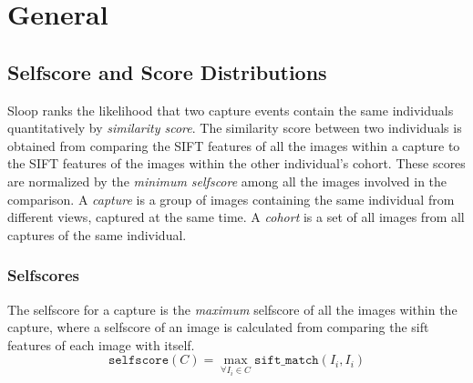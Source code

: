 \section{General}

\subsection{Selfscore and Score Distributions}

Sloop ranks the likelihood that two capture events contain the same individuals
quantitatively by \emph{similarity score}. The similarity score between two
individuals is obtained from comparing the SIFT features of all the images
within a capture to the SIFT features of the images within the other
individual's cohort.  These scores are normalized by the \emph{minimum
selfscore} among all the images involved in the
comparison. A \emph{capture} is a group of images containing the same
individual from different views, captured at the same time.  A \emph{cohort} is
a set of all images from all captures of the same individual.

\subsubsection{Selfscores}

The selfscore for a capture is the \emph{maximum} selfscore of all the images within
the capture, where a selfscore of an image is calculated from comparing the
sift features of each image with itself.
$$\texttt{selfscore}(C) = \max_{\forall I_i \in C} \texttt{sift\_match}(I_i, I_i)$$

